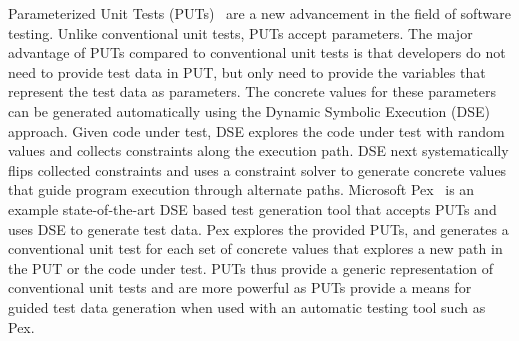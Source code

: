 Parameterized Unit Tests (PUTs)~\cite{tillmann05:parameterized} are a new advancement in the field of software testing. Unlike conventional unit tests, PUTs accept parameters. The major advantage of PUTs compared to conventional unit tests is that developers do not need to provide test data in PUT, but only need to provide the variables that represent the test data as parameters. The concrete values for these parameters can be generated automatically using the Dynamic Symbolic Execution (DSE)~\cite{king:symex, godefroid05:dart, sen07:cute} approach. Given code under test, DSE explores the code under test with random values and collects constraints along the execution path. DSE next systematically flips collected constraints and uses a constraint solver to generate concrete values that guide program execution through alternate paths. Microsoft Pex~\cite{tillmann08:pex, pex:rel} is an example state-of-the-art DSE based test generation tool that accepts PUTs and uses DSE to generate test data. Pex explores the provided PUTs, and generates a conventional unit test for each set of concrete values that explores a new path in the PUT or the code under test. PUTs thus provide a generic representation of conventional unit tests and are more powerful as PUTs provide a means for guided test data generation when used with an automatic testing tool such as Pex. 

